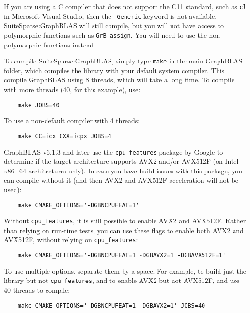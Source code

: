 \documentclass[12pt]{article}
\begin{document}
If you are using a C compiler that does not support the C11 standard, such as
\verb'cl' in Microsoft Visual Studio, then the \verb'_Generic' keyword is not
available.  SuiteSparse:GraphBLAS will still compile, but you will not have
access to polymorphic functions such as \verb'GrB_assign'.  You will need to
use the non-polymorphic functions instead.

To compile SuiteSparse:GraphBLAS, simply type \verb'make' in the main GraphBLAS
folder, which compiles the library with your default system compiler.  This
compile GraphBLAS using 8 threads, which will take a long time.  To compile with
more threads (40, for this example), use:

    {\small
    \begin{verbatim}
    make JOBS=40 \end{verbatim} }

To use a non-default compiler with 4 threads:

    {\small
    \begin{verbatim}
    make CC=icx CXX=icpx JOBS=4 \end{verbatim} }

GraphBLAS v6.1.3 and later use the \verb'cpu_features' package by Google to
determine if the target architecture supports AVX2 and/or AVX512F (on Intel
x86\_64 architectures only).  In case you have build issues with this package,
you can compile without it (and then AVX2 and AVX512F acceleration will not
be used):

    {\small
    \begin{verbatim}
    make CMAKE_OPTIONS='-DGBNCPUFEAT=1'  \end{verbatim} }

Without \verb'cpu_features', it is still possible to enable AVX2 and AVX512F.
Rather than relying on run-time tests, you can use these flags to enable
both AVX2 and AVX512F, without relying on \verb'cpu_features':

    {\small
    \begin{verbatim}
    make CMAKE_OPTIONS='-DGBNCPUFEAT=1 -DGBAVX2=1 -DGBAVX512F=1' \end{verbatim} }

To use multiple options, separate them by a space.  For example, to build
just the library but not \verb'cpu_features', and to enable
AVX2 but not AVX512F, and use 40 threads to compile:

    {\small
    \begin{verbatim}
    make CMAKE_OPTIONS='-DGBNCPUFEAT=1 -DGBAVX2=1' JOBS=40 \end{verbatim} }
\end{document}
